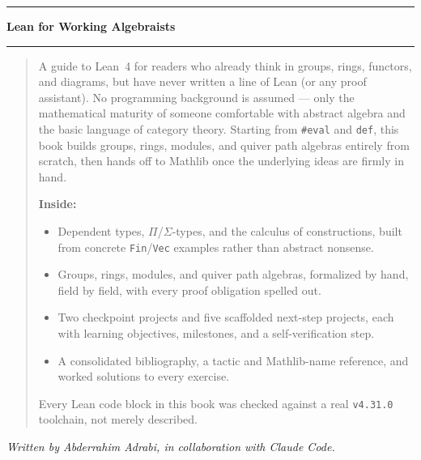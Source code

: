 \clearpage
\thispagestyle{empty}
\null\vfill

\begin{center}
{\color{ruleblue}\rule{0.5\textwidth}{1pt}}\par
\vspace{0.4cm}
{\normalfont\Large\bfseries Lean for Working Algebraists\par}
\vspace{0.4cm}
{\color{ruleblue}\rule{0.5\textwidth}{1pt}}
\end{center}

\vspace{0.8cm}
\begin{quote}
\noindent
A guide to Lean~4 for readers who already think in groups, rings,
functors, and diagrams, but have never written a line of Lean (or any
proof assistant). No programming background is assumed --- only the
mathematical maturity of someone comfortable with abstract algebra and
the basic language of category theory. Starting from \texttt{\#eval} and
\texttt{def}, this book builds groups, rings, modules, and quiver path
algebras entirely from scratch, then hands off to Mathlib once the
underlying ideas are firmly in hand.

\medskip
\noindent\textbf{Inside:}
\begin{itemize}
\item Dependent types, $\Pi$/$\Sigma$-types, and the calculus of
  constructions, built from concrete \texttt{Fin}/\texttt{Vec} examples
  rather than abstract nonsense.
\item Groups, rings, modules, and quiver path algebras, formalized by
  hand, field by field, with every proof obligation spelled out.
\item Two checkpoint projects and five scaffolded next-step projects,
  each with learning objectives, milestones, and a self-verification
  step.
\item A consolidated bibliography, a tactic and Mathlib-name reference,
  and worked solutions to every exercise.
\end{itemize}

\medskip
\noindent Every Lean code block in this book was checked against a real
\texttt{v4.31.0} toolchain, not merely described.
\end{quote}

\vspace{0.8cm}
\begin{center}
{\normalfont\itshape Written by Abderrahim Adrabi, in collaboration with
Claude Code.\par}
\end{center}

\vfill\null
